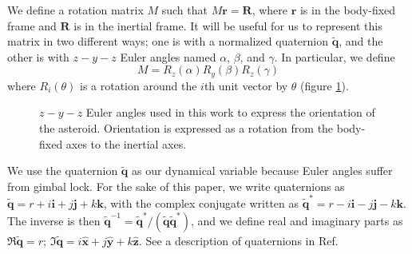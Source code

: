 \documentclass[11pt]{article}
\newcommand{\unit}[1]{\hat{\mathbf{#1}}}
\newcommand{\quat}[1]{\widetilde{\bm{#1}}}
\begin{document}
We define a rotation matrix $M$ such that $M\bm{r} = \bm{R}$, where $\bm{r}$ is in the body-fixed frame and $\bm{R}$ is in the inertial frame. It will be useful for us to represent this matrix in two different ways; one is with a normalized quaternion $\quat q$, and the other is with $z-y-z$ Euler angles named $\alpha$, $\beta$, and $\gamma$. In particular, we define
\begin{equation}
M = R_z(\alpha) R_y(\beta) R_z(\gamma)
\label{eqn:euler-angles}
\end{equation}
where $R_i(\theta)$ is a rotation around the $i$th unit vector by $\theta$ (figure \ref{fig:euler-angles}).


\begin{figure}
\centering
{}
\caption{$z-y-z$ Euler angles used in this work to express the orientation of the asteroid. Orientation is expressed as a rotation from the body-fixed axes to the inertial axes.}
\label{fig:euler-angles}
\end{figure}


We use the quaternion $\quat q$ as our dynamical variable because Euler angles suffer from gimbal lock. For the sake of this paper, we write quaternions as $\quat q = r + i \bm i + j \bm j + k \bm k$, with the complex conjugate written as $\quat q^* = r - i \bm i - j \bm j - k \bm k$. The inverse is then $\quat q^{-1} = \quat q^* / (\quat q \quat q^*)$, and we define real and imaginary parts as $\Re \quat q = r$; $\Im \quat q = i \unit x + j \unit y + k \unit z$. See a description of quaternions in Ref.~\cite{2008arXiv0811.2889G}
\end{document}
